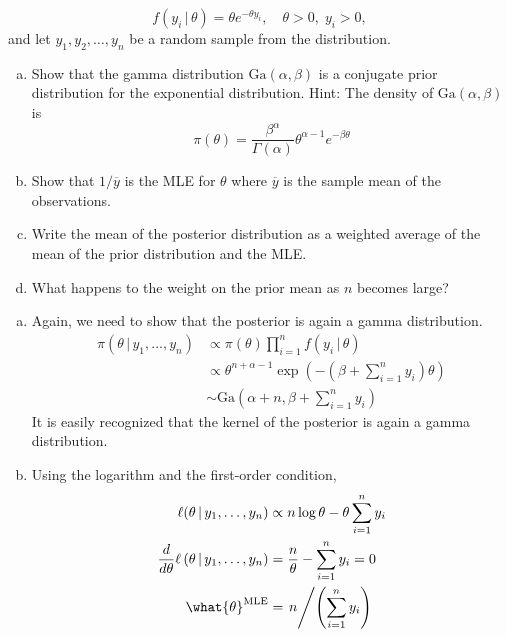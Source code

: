 \documentclass[answers]{exam}
\begin{document}
\begin{questions}
  \begin{equation}
    f(y_{i}\,|\,\theta) = \theta e^{-\theta y_{i}},\quad \theta>0, \; y_{i}>0,
  \end{equation}
  and let $y_{1},y_{2},\ldots,y_{n}$ be a random sample from the distribution.
  \begin{enumerate}[(a)]
    \item Show that the gamma distribution $\mathrm{Ga}(\alpha,\beta)$ is a conjugate prior distribution for the exponential distribution. Hint: The density of $\mathrm{Ga}(\alpha,\beta)$ is
    \begin{equation}
      \pi(\theta) = \dfrac{\beta^{\alpha}}{\Gamma(\alpha)}\theta^{\alpha-1}e^{-\beta\theta}
    \end{equation}
    \item Show that $1/\overline{y}$ is the MLE for $\theta$ where $\overline{y}$ is the sample mean of the observations.
    \item Write the mean of the posterior distribution as a weighted average of the mean of the prior distribution and the MLE.
    \item What happens to the weight on the prior mean as $n$ becomes large?
  \end{enumerate}
  \begin{solution}
    \begin{enumerate}[(a)]
      \item Again, we need to show that the posterior is again a gamma distribution.
      \begin{align}
        \pi\left(\theta\,|\,y_{1},\ldots,y_{n}\right) &\propto \pi\left(\theta\right)\prod_{i=1}^{n}f(y_{i}\,|\,\theta)\\
        &\propto \theta^{n+\alpha-1}\exp\left(-\left(\beta+\sum_{i=1}^{n}y_{i}\right)\theta\right)\\
        &\sim \mathrm{Ga}\left(\alpha+n,\beta+\sum_{i=1}^{n}y_{i}\right)
      \end{align}
      It is easily recognized that the kernel of the posterior is again a gamma distribution.
      \item Using the logarithm and the first-order condition,
      \begin{align}
        \ell(\theta\,|\,y_{1},\ldots,y_{n}) &\propto n\log\theta-\theta\sum_{i=1}^{n}y_{i}\\
        \dfrac{d}{d\theta}\ell\left(\theta\,|\,y_{1},\ldots,y_{n}\right) &= \dfrac{n}{\theta}-\sum_{i=1}^{n}y_{i} = 0\\
        \what{\theta}^{\text{MLE}} &= \left. n\middle/\left(\sum_{i=1}^{n}y_{i}\right)\right.\\

\end{align}
\end{enumerate}
\end{solution}
\end{questions}
\end{document}
